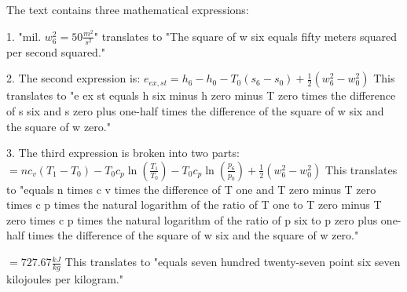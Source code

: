 The text contains three mathematical expressions:

1. "mil. \( w_6^2 = 50 \frac{m^2}{s^2} \)" translates to "The square of w six equals fifty meters squared per second squared."

2. The second expression is:
   \( e_{ex,st} = h_6 - h_0 - T_0 ( s_6 - s_0 ) + \frac{1}{2} ( w_6^2 - w_0^2 ) \)
   This translates to "e ex st equals h six minus h zero minus T zero times the difference of s six and s zero plus one-half times the difference of the square of w six and the square of w zero."

3. The third expression is broken into two parts:
   \( = n c_v ( T_1 - T_0 ) - T_0 c_p \ln \left( \frac{T_1}{T_0} \right) - T_0 c_p \ln \left( \frac{p_6}{p_0} \right) + \frac{1}{2} ( w_6^2 - w_0^2 ) \)
   This translates to "equals n times c v times the difference of T one and T zero minus T zero times c p times the natural logarithm of the ratio of T one to T zero minus T zero times c p times the natural logarithm of the ratio of p six to p zero plus one-half times the difference of the square of w six and the square of w zero."

   \( = 727.67 \frac{kJ}{kg} \)
   This translates to "equals seven hundred twenty-seven point six seven kilojoules per kilogram."